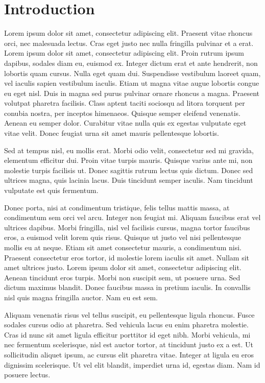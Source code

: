 \section{Introduction}

Lorem ipsum dolor sit amet, consectetur adipiscing elit. Praesent vitae rhoncus orci, nec malesuada lectus. Cras eget justo nec nulla fringilla pulvinar et a erat. Lorem ipsum dolor sit amet, consectetur adipiscing elit. Proin rutrum ipsum dapibus, sodales diam eu, euismod ex. Integer dictum erat et ante hendrerit, non lobortis quam cursus. Nulla eget quam dui. Suspendisse vestibulum laoreet quam, vel iaculis sapien vestibulum iaculis. Etiam ut magna vitae augue lobortis congue eu eget nisl. Duis in magna sed purus pulvinar ornare rhoncus a magna. Praesent volutpat pharetra facilisis. Class aptent taciti sociosqu ad litora torquent per conubia nostra, per inceptos himenaeos. Quisque semper eleifend venenatis. Aenean eu semper dolor. Curabitur vitae nulla quis ex egestas vulputate eget vitae velit. Donec feugiat urna sit amet mauris pellentesque lobortis.

Sed at tempus nisl, eu mollis erat. Morbi odio velit, consectetur sed mi gravida, elementum efficitur dui. Proin vitae turpis mauris. Quisque varius ante mi, non molestie turpis facilisis ut. Donec sagittis rutrum lectus quis dictum. Donec sed ultrices magna, quis lacinia lacus. Duis tincidunt semper iaculis. Nam tincidunt vulputate est quis fermentum.

Donec porta, nisi at condimentum tristique, felis tellus mattis massa, at condimentum sem orci vel arcu. Integer non feugiat mi. Aliquam faucibus erat vel ultrices dapibus. Morbi fringilla, nisl vel facilisis cursus, magna tortor faucibus eros, a euismod velit lorem quis risus. Quisque ut justo vel nisi pellentesque mollis eu at neque. Etiam sit amet consectetur mauris, a condimentum nisi. Praesent consectetur eros tortor, id molestie lorem iaculis sit amet. Nullam sit amet ultrices justo. Lorem ipsum dolor sit amet, consectetur adipiscing elit. Aenean tincidunt eros turpis. Morbi non suscipit sem, ut posuere urna. Sed dictum maximus blandit. Donec faucibus massa in pretium iaculis. In convallis nisl quis magna fringilla auctor. Nam eu est sem.

Aliquam venenatis risus vel tellus suscipit, eu pellentesque ligula rhoncus. Fusce sodales cursus odio at pharetra. Sed vehicula lacus eu enim pharetra molestie. Cras id nunc sit amet ligula efficitur porttitor id eget nibh. Morbi vehicula, mi nec fermentum scelerisque, nisl est auctor tortor, at tincidunt justo ex a est. Ut sollicitudin aliquet ipsum, ac cursus elit pharetra vitae. Integer at ligula eu eros dignissim scelerisque. Ut vel elit blandit, imperdiet urna id, egestas diam. Nam id posuere lectus.

